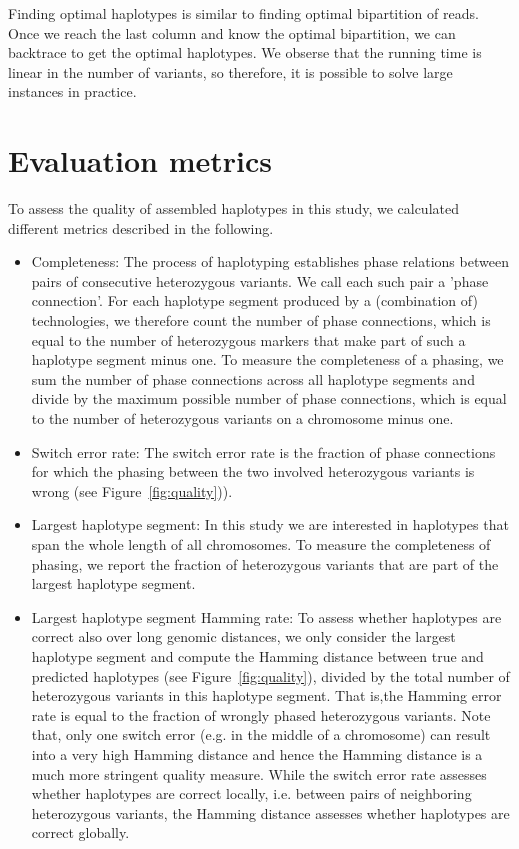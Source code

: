 Finding optimal haplotypes is similar to finding optimal bipartition of reads. Once we reach the last column and know the optimal bipartition, we can backtrace to get the optimal haplotypes.
We obserse that the running time is linear in the number of variants, so therefore, it is possible to solve large instances in practice.

\section{Evaluation metrics}
To assess the quality of assembled haplotypes in this study, we calculated different metrics described in the following.

\begin{itemize}
 \item Completeness: The process of haplotyping establishes phase relations between pairs of consecutive heterozygous variants. We call each such pair a 'phase connection'. For each haplotype segment produced by a (combination of) technologies, we therefore count the number of phase connections, which is equal to the number of heterozygous markers that make part of such a haplotype segment minus one. 
To measure the completeness of a phasing, we sum the number of phase connections across all haplotype segments and divide by the maximum possible number of phase connections, which is equal to the number of heterozygous variants on a chromosome minus one.
\item Switch error rate: The switch error rate is the fraction of phase connections for which the phasing between the two involved heterozygous variants is wrong (see Figure~\ref{fig:quality})).
\item Largest haplotype segment: In this study we are interested in haplotypes that span the whole length of all chromosomes. To measure the completeness of phasing, we report the fraction of heterozygous variants that are part of the largest haplotype segment.
\item Largest haplotype segment Hamming rate: To assess whether haplotypes are correct also over long genomic distances, we only consider the largest haplotype segment and compute the Hamming distance between true and predicted haplotypes (see Figure~\ref{fig:quality}),
divided by the total number of heterozygous variants in this haplotype segment. 
That is,the Hamming error rate is equal to the fraction of wrongly phased heterozygous variants. 
Note that, only one switch error (e.g. in the middle of a chromosome) can result  into a very high Hamming distance and hence the Hamming distance is a much more stringent quality measure. 
While the switch error rate assesses whether haplotypes are correct locally, i.e. between pairs of neighboring heterozygous variants, the Hamming distance assesses whether haplotypes are correct globally.
\end{itemize}

